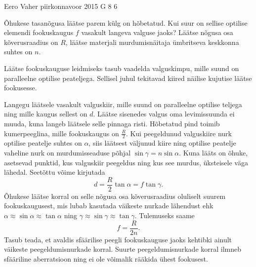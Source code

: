 {Eero Vaher} %
{piirkonnavoor} %
{2015} %
{G 8} %
{6} %
{
\ifStatement
Õhukese tasanõgusa läätse parem külg on hõbetatud. Kui suur on sellise optilise elemendi fookuskaugus $f$ vasakult langeva valguse jaoks? Läätse nõgusa osa kõverusraadius on $R$, läätse materjali murdumisnäitaja ümbritseva keskkonna suhtes on $n$.

\begin{center}
\end{center}
\fi


\ifHint
Läätse fookuskauguse leidmiseks tasub vaadelda valguskimpu, mille suund on paralleelne optilise peateljega. Sellisel juhul tekitavad kiired näilise kujutise läätse fookusesse.
\fi


\ifSolution
Langegu läätsele vasakult valguskiir, mille suund on paralleelne optilise teljega ning mille kaugus sellest on $d$. Läätse sisenedes valgus oma levimissuunda ei muuda, kuna langeb läätsele selle pinnaga risti. Hõbetatud pind toimib kumerpeeglina, mille fookuskaugus on $\frac{R}{2}$. Kui peegeldunud valguskiire nurk optilise peatelje suhtes on $\alpha$, siis läätsest väljunud kiire ning optilise peatelje vaheline nurk on murdumisseaduse põhjal $\sin\gamma=n\sin\alpha$. Kuna lääts on õhuke, asetsevad punktid, kus valguskiir peegeldus ning kus see murdus, üksteisele väga lähedal. Seetõttu võime kirjutada
\[ d=\frac{R}{2}\tan\alpha=f\tan\gamma. \]
Õhukese läätse korral on selle nõgusa osa kõverusraadius oluliselt suurem fookuskaugusest, mis lubab kasutada väikeste nurkade lähendust ehk $\alpha\approx\sin\alpha\approx\tan\alpha$ ning $\gamma\approx\sin\gamma\approx\tan\gamma$. Tulemuseks saame
\[ f=\frac{R}{2n}. \]
Tasub teada, et avaldis sfäärilise peegli fookuskauguse jaoks kehtibki ainult väikeste peegeldumisnurkade korral. Suurte peegeldumisnurkade korral ilmneb sfääriline aberratsioon ning ei ole võimalik rääkida ühest fookusest.

}
